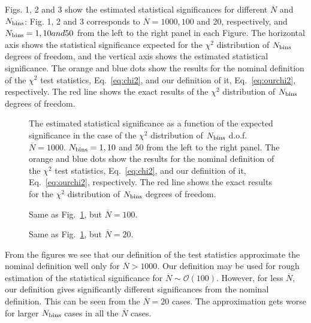 \documentclass[12pt,a4paper]{article}
\newcommand{\order}{{\mathcal O}}
\begin{document}
Figs. 1, 2 and 3 show the estimated statistical significances for
different $\overline{N}$ and $N_{\rm bins}$: Fig. 1, 2 and 3 corresponds to $\overline{N} = 1000, 100$ and 20,
respectively, and $N_{\rm bins}
= 1, 10 and 50$ from the left to the right panel in each Figure.
The horizontal axis shows the statistical significance expected for the
$\chi^2$ distribution of $N_{\rm bins}$ degrees of freedom, and the
vertical axis shows the estimated statistical significance. The orange
and blue dots show the results for the nominal definition of the $\chi^2$
test statistics, Eq.~\eqref{eq:chi2}, and our definition of it, Eq.~\eqref{eq:ourchi2},
respectively. The red line
shows the exact results of the $\chi^2$ distribution of $N_{\rm bins}$
degrees of freedom. 
\begin{figure}[ht]
 \centering
\resizebox{1.0\textwidth}{!}{
\texttt{[image: figures/Nbar=1000.pdf]}
}
  \caption{The estimated statistical significance as a function of the
 expected significance in the case of the $\chi^2$ distribution of
 $N_{\rm bins}$ d.o.f. $\overline{N} = 1000$. $N_{\rm bins} = 1, 10$ and
 50 from the left to the right panel. The orange
and blue dots show the results for the nominal definition of the $\chi^2$
test statistics, Eq.~\eqref{eq:chi2}, and our definition of it, Eq.~\eqref{eq:ourchi2},
respectively. The red line
shows the exact results for the $\chi^2$ distribution of $N_{\rm bins}$
degrees of freedom.}
\label{fig:nbar=1000}
\end{figure}

\begin{figure}[ht]
 \centering
\resizebox{1.0\textwidth}{!}{
\texttt{[image: figures/Nbar=100.pdf]}
}
  \caption{Same as Fig.~\ref{fig:nbar=1000}, but $\overline{N} = 100$.}
\label{fig:nbar=100}
\end{figure}

\begin{figure}[ht]
 \centering
\resizebox{1.0\textwidth}{!}{
\texttt{[image: figures/Nbar=20.pdf]}
}
  \caption{Same as Fig.~\ref{fig:nbar=1000}, but $\overline{N} = 20$.}
\label{fig:nbar=20}
\end{figure}

From the figures we see that our definition of the test
statistics approximate the nominal definition well only for $\overline{N}
> 1000$. Our definition may be used for rough estimation of the
statistical significance for $\overline{N}\sim \order(100)$. However,
for less $\overline{N}$, our definition gives significantly different
significances from the nominal
definition. This can be seen from the $\overline{N} = 20$ cases. 
The approximation gets worse for larger $N_{\rm bins}$ cases in all the
$\overline{N}$ cases. 
\end{document}
